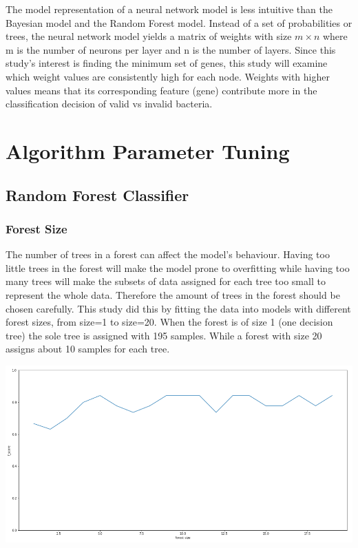 \documentclass[]{report}
\begin{document}
The model representation of a neural network model is less intuitive
than the Bayesian model and the Random Forest model. Instead of a set of
probabilities or trees, the neural network model yields a matrix of
weights with size \(m \times n\) where m is the number of neurons per
layer and n is the number of layers. Since this study's interest is
finding the minimum set of genes, this study will examine which weight
values are consistently high for each node. Weights with higher values
means that its corresponding feature (gene) contribute more in the
classification decision of valid vs invalid bacteria.

\section{Algorithm Parameter Tuning}\label{algorithm-parameter-tuning}

\subsection{Random Forest Classifier}\label{random-forest-classifier-1}

\subsubsection{Forest Size}\label{forest-size}

The number of trees in a forest can affect the model's behaviour. Having
too little trees in the forest will make the model prone to overfitting
while having too many trees will make the subsets of data assigned for
each tree too small to represent the whole data. Therefore the amount of
trees in the forest should be chosen carefully. This study did this by
fitting the data into models with different forest sizes, from size=1 to
size=20. When the forest is of size 1 (one decision tree) the sole tree
is assigned with 195 samples. While a forest with size 20 assigns about
10 samples for each tree.

\includegraphics{images/forestsize.png}
\end{document}
